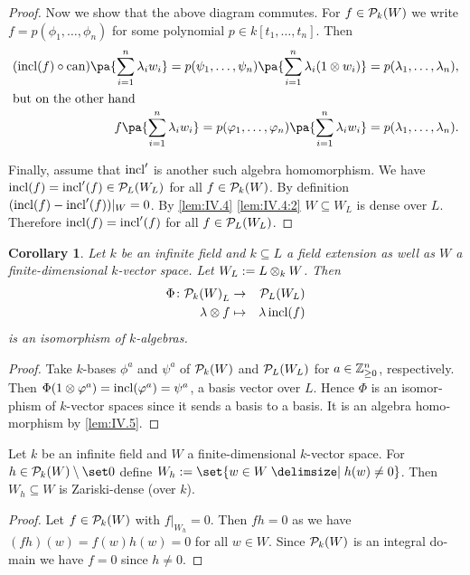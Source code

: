 \documentclass[12pt,a4paper]{scrartcl}
\theoremstyle{cplain}
\newtheorem{cor}[thmcounter]{Corollary}
\theoremstyle{cplain}
\theoremstyle{cplain}
\theoremstyle{definition}
\begin{document}
\begin{otherlanguage}{english}
\begin{proof}
  Now we show that the above diagram commutes. For $f\in\mathcal{P}_k(W)$ we write $f = p(\phi_1,\ldots,\phi_n)$ for some polynomial $p\in k[t_1,\ldots,t_n]$. Then
  \begin{align*}
    (\incl(f) \circ \can)\pa{\sum_{i=1}^n\lambda_iw_i} = p(\psi_1,\ldots,\psi_n)\pa{\sum_{i=1}^n\lambda_i(1\tp w_i)} &= p(\lambda_1,\ldots,\lambda_n), \\\intertext{but on the other hand}
    f\pa{\sum_{i=1}^n\lambda_iw_i} = p(\phi_1,\ldots,\phi_n)\pa{\sum_{i=1}^n\lambda_iw_i} &= p(\lambda_1,\ldots,\lambda_n).
  \end{align*}
  
  Finally, assume that $\operatorname{incl}'$ is another such algebra homomorphism. We have $\operatorname{incl}(f) = \operatorname{incl}'(f) \in \mathcal{P}_L(W_L)$ for all $f\in \mathcal{P}_k(W)$. By definition $(\operatorname{incl}(f) - \operatorname{incl}'(f))|_W = 0$. By \cref{lem:IV.4} \ref{lem:IV.4:2} $W \subseteq W_L$ is dense over $L$. Therefore $\operatorname{incl}(f) = \operatorname{incl}'(f)$ for all $f \in \mathcal{P}_L(W_L)$.
\end{proof}

\begin{cor}
  Let $k$ be an infinite field and $k \subseteq L$ a field extension as well as $W$ a finite-dimensional $k$-vector space. Let $W_L := L \otimes_k W$. Then
  \begin{eqnarray*}
    \Phi\colon {\mathcal{P}_k(W)}_L &\to& \mathcal{P}_L(W_L) \\
    \lambda \otimes f &\mapsto& \lambda\operatorname{incl}(f)
  \end{eqnarray*}
  is an isomorphism of $k$-algebras.
\end{cor}
\begin{proof}
  Take $k$-bases $\phi^a$ and $\psi^a$ of $\mathcal{P}_k(W)$ and $\mathcal{P}_L(W_L)$ for $a \in \mathbb Z_{\ge0}^n$, respectively. Then $\Phi(1 \otimes \varphi^a) = \operatorname{incl}(\varphi^a) = \psi^a$, a basis vector over $L$. Hence $\Phi$ is an isomorphism of $k$-vector spaces since it sends a basis to a basis. It is an algebra homomorphism by \cref{lem:IV.5}.
\end{proof}

\begin{lem} \label{lem:IV.7}
  Let $k$ be an infinite field and $W$ a finite-dimensional $k$-vector space. For $h\in\Ps_k(W)\setminus\set0$ define $W_h := \set{w\in W\given h(w) \neq 0}$. Then $W_h \subseteq W$ is Zariski-dense (over $k$).
\end{lem}
\begin{proof}
  Let $f \in \mathcal{P}_k(W)$ with $f|_{W_h} = 0$. Then $fh = 0$ as we have $(fh)(w) = f(w)h(w) = 0$ for all $w \in W$. Since $\mathcal{P}_k(W)$ is an integral domain we have $f=0$ since $h \neq 0$.
\end{proof}


\end{otherlanguage}
\end{document}
